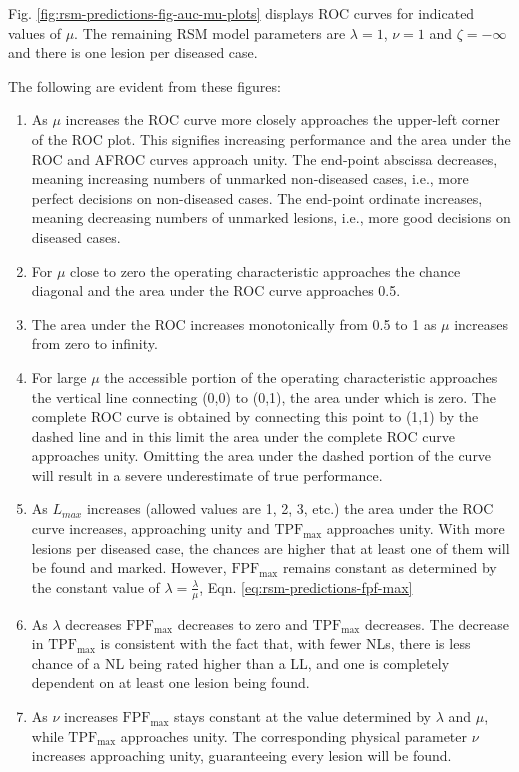 \documentclass[
]{book}
\providecommand{\tightlist}{%
  \setlength{\itemsep}{0pt}\setlength{\parskip}{0pt}}
\begin{document}
Fig. \ref{fig:rsm-predictions-fig-auc-mu-plots} displays ROC curves for indicated values of \(\mu\). The remaining RSM model parameters are \(\lambda = 1\), \(\nu = 1\) and \(\zeta = -\infty\) and there is one lesion per diseased case.

The following are evident from these figures:

\begin{enumerate}
\def\labelenumi{\arabic{enumi}.}
\tightlist
\item
  As \(\mu\) increases the ROC curve more closely approaches the upper-left corner of the ROC plot. This signifies increasing performance and the area under the ROC and AFROC curves approach unity. The end-point abscissa decreases, meaning increasing numbers of unmarked non-diseased cases, i.e., more perfect decisions on non-diseased cases. The end-point ordinate increases, meaning decreasing numbers of unmarked lesions, i.e., more good decisions on diseased cases.
\item
  For \(\mu\) close to zero the operating characteristic approaches the chance diagonal and the area under the ROC curve approaches 0.5.
\item
  The area under the ROC increases monotonically from 0.5 to 1 as \(\mu\) increases from zero to infinity.
\item
  For large \(\mu\) the accessible portion of the operating characteristic approaches the vertical line connecting (0,0) to (0,1), the area under which is zero. The complete ROC curve is obtained by connecting this point to (1,1) by the dashed line and in this limit the area under the complete ROC curve approaches unity. Omitting the area under the dashed portion of the curve will result in a severe underestimate of true performance.
\item
  As \(L_{max}\) increases (allowed values are 1, 2, 3, etc.) the area under the ROC curve increases, approaching unity and \(\text{TPF}_{\text{max}}\) approaches unity. With more lesions per diseased case, the chances are higher that at least one of them will be found and marked. However, \(\text{FPF}_{\text{max}}\) remains constant as determined by the constant value of \(\lambda = \frac{\lambda}{\mu}\), Eqn. \eqref{eq:rsm-predictions-fpf-max}
\item
  As \(\lambda\) decreases \(\text{FPF}_{\text{max}}\) decreases to zero and \(\text{TPF}_{\text{max}}\) decreases. The decrease in \(\text{TPF}_{\text{max}}\) is consistent with the fact that, with fewer NLs, there is less chance of a NL being rated higher than a LL, and one is completely dependent on at least one lesion being found.
\item
  As \(\nu\) increases \(\text{FPF}_{\text{max}}\) stays constant at the value determined by \(\lambda\) and \(\mu\), while \(\text{TPF}_{\text{max}}\) approaches unity. The corresponding physical parameter \(\nu\) increases approaching unity, guaranteeing every lesion will be found.
\end{enumerate}
\end{document}
